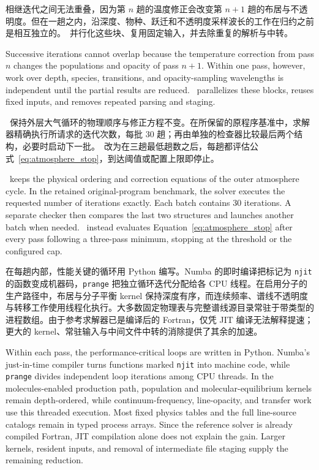 相继迭代之间无法重叠，因为第 $n$ 趟的温度修正会改变第 $n+1$ 趟的布居与不透明度。但在一趟之内，沿深度、物种、跃迁和不透明度采样波长的工作在归约之前是相互独立的。\paynezero\ 并行化这些块、复用固定输入，并去除重复的解析与中转。

\begin{EN}
Successive iterations cannot overlap because the temperature correction from
pass $n$ changes the populations and opacity of pass $n+1$. Within one pass,
however, work over depth, species, transitions, and opacity-sampling wavelengths
is independent until the partial results are reduced. \paynezero\ parallelizes
these blocks, reuses fixed inputs, and removes repeated parsing and staging.
\end{EN}

\paynezero\ 保持外层大气循环的物理顺序与修正方程不变。在所保留的原程序基准中，求解器精确执行所请求的迭代次数，每批 30 趟；再由单独的检查器比较最后两个结构，必要时启动下一批。\paynezero\ 改为在三趟最低趟数之后，每趟都评估公式~\ref{eq:atmosphere_stop}，到达阈值或配置上限即停止。

\begin{EN}
\paynezero\ keeps the physical ordering and correction equations of the outer
atmosphere cycle. In the retained original-program benchmark, the solver executes
the requested number of iterations exactly. Each batch contains 30 iterations.
A separate checker then compares the last two structures and launches another
batch when needed. \paynezero\ instead evaluates
Equation~\ref{eq:atmosphere_stop} after every pass following a three-pass
minimum, stopping at the threshold or the configured cap.
\end{EN}

在每趟内部，性能关键的循环用 Python 编写。Numba 的即时编译把标记为 \texttt{njit} 的函数变成机器码，\texttt{prange} 把独立循环迭代分配给各 CPU 线程。在启用分子的生产路径中，布居与分子平衡 kernel 保持深度有序，而连续频率、谱线不透明度与转移工作使用线程化执行。大多数固定物理表与完整谱线源目录常驻于带类型的进程数组。由于参考求解器已是编译后的 Fortran，仅凭 JIT 编译无法解释提速；更大的 kernel、常驻输入与中间文件中转的消除提供了其余的加速。

\begin{EN}
Within each pass, the performance-critical loops are written in Python.
Numba's just-in-time compiler turns functions marked \texttt{njit} into
machine code, while \texttt{prange} divides independent loop iterations among
CPU threads. In the molecules-enabled production path, population and
molecular-equilibrium kernels remain depth-ordered, while continuum-frequency,
line-opacity, and transfer work use this threaded execution. Most fixed physics tables and the full line-source
catalogs remain in typed process arrays. Since the reference solver is already
compiled Fortran, JIT compilation alone does not explain the gain. Larger
kernels, resident inputs, and removal of intermediate file staging supply the
remaining reduction.
\end{EN}

